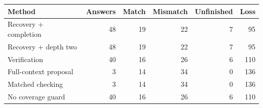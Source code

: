 \begin{tabular}{lrrrrr}
\toprule
Method & Answers & Match & Mismatch & Unfinished & Loss \\
\midrule
Recovery + completion & 48 & 19 & 22 & 7 & 95 \\
Recovery + depth two & 48 & 19 & 22 & 7 & 95 \\
Verification & 40 & 16 & 26 & 6 & 110 \\
Full-context proposal & 3 & 14 & 34 & 0 & 136 \\
Matched checking & 3 & 14 & 34 & 0 & 136 \\
No coverage guard & 40 & 16 & 26 & 6 & 110 \\
\bottomrule
\end{tabular}
